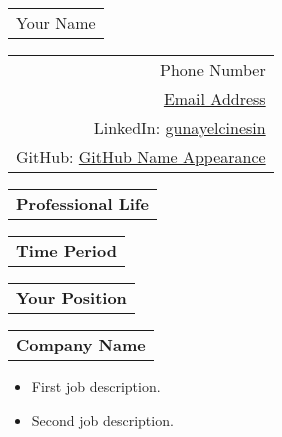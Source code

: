 \documentclass{article}
\begin{document}
  \begin{tcolorbox}
    {\fontsize{21}{11}\bfseries\begin{tabular}[c]{l}
      Your Name %
    \end{tabular}}\hfill
    {\small\begin{tabular}[c]{r}
      Phone Number \\ %
      \href{mailto: Email Address}{Email Address} \\ %
      LinkedIn: \href{LinkedIn url}{gunayelcinesin} \\ %
      GitHub: \href{GitHub url}{GitHub Name Appearance} \\ %
    \end{tabular}}
  \end{tcolorbox}

    \bigskip
    
    \begin{tabular}[c]{l}
      \textbf{Professional Life} \end{tabular} 
      \hline \hline \vspace{2pt}
      \begin{tabular}[c]{l} \textbf{Time Period} \end{tabular} \hfill
      \begin{tabular}[c]{c} \textbf{Your Position} \end{tabular} \hfill
      \begin{tabular}[c]{r} \textbf{Company Name} 
    \end{tabular}
    
   \begin{description}[style=nextline, listparindent=\parindent, parsep=0pt, \vspace{-1pt}]
    \begin{itemize}[, leftmargin=.01in]
        \item First job description.
        \item Second job description.
    \end{itemize}
   \end{description} \\

    \skip
    
\end{document}
